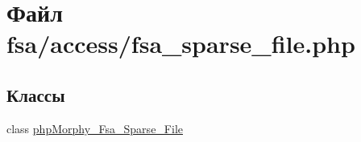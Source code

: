 \hypertarget{fsa__sparse__file_8php}{
\section{Файл fsa/access/fsa\_\-sparse\_\-file.php}
\label{fsa__sparse__file_8php}
}
\subsection*{Классы}
\begin{DoxyCompactItemize}
\item 
class \hyperlink{classphpMorphy__Fsa__Sparse__File}{phpMorphy\_\-Fsa\_\-Sparse\_\-File}
\end{DoxyCompactItemize}
